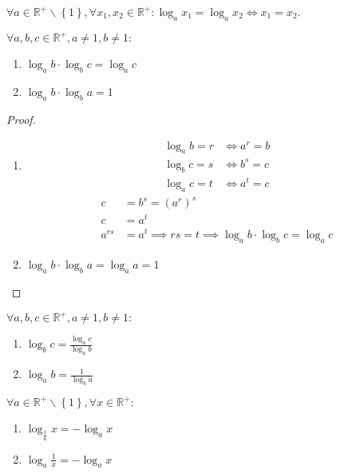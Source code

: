 \begin{veta}\label{zakl_reseni}
    $\forall a \in \mathbb R^+ \smallsetminus \left \{ 1 \right \},
    \forall x_1, x_2\in \mathbb R^+: \log_a x_1 = \log_a x_2 \iff x_1 = x_2$.
\end{veta}

\begin{veta}
    $\forall a,b,c\in \mathbb R^+, a\ne 1, b\ne 1:$
    \begin{enumerate}[$i.$]
        \item $\log_a b \cdot \log_b c = \log_a c$
       	\item $\log_a b \cdot \log_b a = 1$
    \end{enumerate}
\end{veta}

\begin{proof}
    \begin{enumerate}[$i.$]
        \item \begin{align*}
            \log_a b = r &\iff a^r = b \\
            \log_b c = s &\iff b^s = c \\
            \log_a c = t &\iff a^t = c
        \end{align*}
        \begin{align*}
            c & =b^s=\left ( a^r \right )^s\\
            c & = a^t\\
            a^{rs} & = a^t \implies rs = t \implies \log_a b \cdot \log_b c = \log_a c
        \end{align*}
        \item $\log_a b\cdot \log_b a = \log_a a = 1$\qedhere
    \end{enumerate}
\end{proof}

\begin{veta}
    $\forall a,b,c\in \mathbb R^+, a\ne 1, b\ne 1:$
    \begin{enumerate}[$i.$]
        \item $\log_b c = \frac{\log_a c}{\log_a b}$
       	\item $\log_a b = \frac{1}{\log_b a}$
    \end{enumerate}
\end{veta}

\begin{veta}
    $\forall a \in \mathbb R^+ \smallsetminus \left \{ 1 \right \}  , \forall x \in \mathbb R^+:$
    \begin{enumerate}[$i.$]
        \item $\log_{\frac{1}{a}} x = -\log_a x$
       	\item $\log_a \frac{1}{x} = -\log_a x$
    \end{enumerate}
\end{veta}


